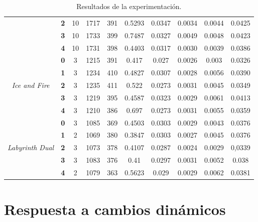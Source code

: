 \begin{landscape}
\begin{table}[]
{\begin{tabular}{|c|c|cccccccc|}
                                         & \textbf{2} & 10 & 1717 & 391 & 0.5293 & 0.0347 & 0.0034 & 0.0044 & 0.0425 \\ \cline{2-10} 
                                         & \textbf{3} & 10 & 1733 & 399 & 0.7487 & 0.0327 & 0.0049 & 0.0048 & 0.0423 \\ \cline{2-10} 
                                         & \textbf{4} & 10 & 1731 & 398 & 0.4403 & 0.0317 & 0.0030 & 0.0039 & 0.0386 \\ \hline
\multirow{5}{*}{\textit{Ice and Fire}}   & \textbf{0} & 3  & 1215 & 391 & 0.417  & 0.027  & 0.0026 & 0.003  & 0.0326 \\ \cline{2-10} 
                                         & \textbf{1} & 3  & 1234 & 410 & 0.4827 & 0.0307 & 0.0028 & 0.0056 & 0.0390 \\ \cline{2-10} 
                                         & \textbf{2} & 3  & 1235 & 411 & 0.522  & 0.0273 & 0.0031 & 0.0045 & 0.0349 \\ \cline{2-10} 
                                         & \textbf{3} & 3  & 1219 & 395 & 0.4587 & 0.0323 & 0.0029 & 0.0061 & 0.0413 \\ \cline{2-10} 
                                         & \textbf{4} & 3  & 1210 & 386 & 0.697  & 0.0273 & 0.0031 & 0.0055 & 0.0359 \\ \hline
\multirow{5}{*}{\textit{Labyrinth Dual}} & \textbf{0} & 3  & 1085 & 369 & 0.4503 & 0.0303 & 0.0029 & 0.0043 & 0.0376 \\ \cline{2-10} 
                                         & \textbf{1} & 2  & 1069 & 380 & 0.3847 & 0.0303 & 0.0027 & 0.0045 & 0.0376 \\ \cline{2-10} 
                                         & \textbf{2} & 3  & 1073 & 378 & 0.4107 & 0.0287 & 0.0024 & 0.0029 & 0,0339 \\ \cline{2-10} 
                                         & \textbf{3} & 3  & 1083 & 376 & 0.41   & 0.0297 & 0.0031 & 0.0052 & 0.038  \\ \cline{2-10} 
                                         & \textbf{4} & 2  & 1079 & 363 & 0.5623 & 0.029  & 0.0029 & 0.0062 & 0.0381 \\ \hline
\end{tabular}%
}
\caption{Resultados de la experimentación.}
\label{tab:exp-results}
\end{table}
\end{landscape}

\section{Respuesta a cambios dinámicos}

